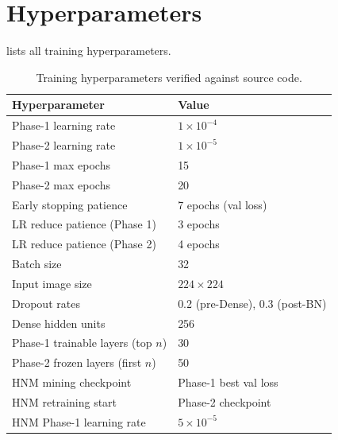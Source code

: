 \documentclass[a4paper,fleqn]{cas-sc}
\begin{document}



\appendix

\section{Hyperparameters}
\label{app:hyperparams}

 lists all training hyperparameters.

\begin{table}
  \centering
  \caption{Training hyperparameters verified against source code.}
  \label{tab:hyperparams}
  \small
  \begin{tabular}{ll}
    \toprule
    \textbf{Hyperparameter} & \textbf{Value} \\
    \midrule
    Phase-1 learning rate             & $1 \times 10^{-4}$ \\
    Phase-2 learning rate             & $1 \times 10^{-5}$ \\
    Phase-1 max epochs                & 15 \\
    Phase-2 max epochs                & 20 \\
    Early stopping patience           & 7 epochs (val loss) \\
    LR reduce patience (Phase 1)      & 3 epochs \\
    LR reduce patience (Phase 2)      & 4 epochs \\
    Batch size                        & 32 \\
    Input image size                  & $224 \times 224$ \\
    Dropout rates                     & 0.2 (pre-Dense), 0.3 (post-BN) \\
    Dense hidden units                & 256 \\
    Phase-1 trainable layers (top $n$)& 30 \\
    Phase-2 frozen layers (first $n$) & 50 \\
    HNM mining checkpoint             & Phase-1 best val loss \\
    HNM retraining start              & Phase-2 checkpoint \\
    HNM Phase-1 learning rate         & $5 \times 10^{-5}$ \\

\end{tabular}
\end{table}
\end{document}
